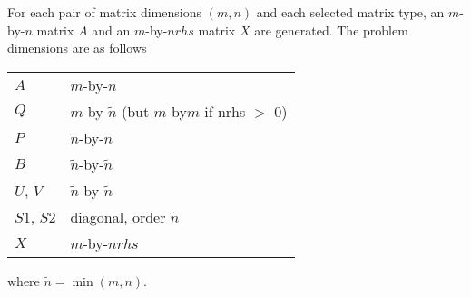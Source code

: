For each pair of matrix dimensions $(m,n)$ and each selected matrix
type, an $m$-by-$n$ matrix $A$ and an $m$-by-$nrhs$ matrix $X$ are generated.
The problem dimensions are as follows
\begin{center}
  \begin{tabular}{ll}
   $A$      &    $m$-by-$n$ \\
   $Q$      &    $m$-by-$\tilde n$ (but $m$-by$m$ if nrhs $>$ 0) \\
   $P$      &    $\tilde n$-by-$n$ \\
   $B$      &    $\tilde n$-by-$\tilde n$ \\
   $U$, $V$ &    $\tilde n$-by-$\tilde n$ \\
   $S1$, $S2$ &  diagonal, order $\tilde n$ \\
   $X$        &  $m$-by-$nrhs$
  \end{tabular}
\end{center}
where $\tilde n = \min(m,n)$.

